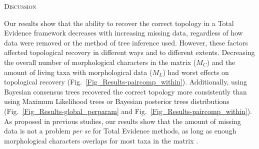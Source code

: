 \documentclass[12pt,letterpaper]{article}
\renewcommand{\section}[1]{%
\bigskip
\begin{center}
\begin{Large}
\normalfont\scshape #1
\medskip
\end{Large}
\end{center}}
\begin{document}
%
%



\section{Discussion}

Our results show that the ability to recover the correct topology in a Total Evidence framework decreases with increasing missing data, regardless of how data were removed or the method of tree inference used. However, these factors affected topological recovery in different ways and to different extents. 
Decreasing the overall number of morphological characters in the matrix ($M_{C}$) and the amount of living taxa with morphological data ($M_{L}$) had worst effects on topological recovery (Fig.~\ref{Fig_Results-paircomp_within}). Additionally, using Bayesian consensus trees recovered the correct topology more consistently than using Maximum Likelihood trees or Bayesian posterior trees distributions (Fig.~\ref{Fig_Results-global_perparam} and Fig.~\ref{Fig_Results-paircomp_within}).
As proposed in previous studies, our results show that the amount of missing data is not a problem \textit{per se} for Total Evidence methods, as long as enough morphological characters overlaps for most taxa in the matrix \citep[e.g.][]{kearneyfragmentary2002,wiensmissing2003,rouresite-specific2011,pattinsonphylogeny2014}. %
\end{document}
